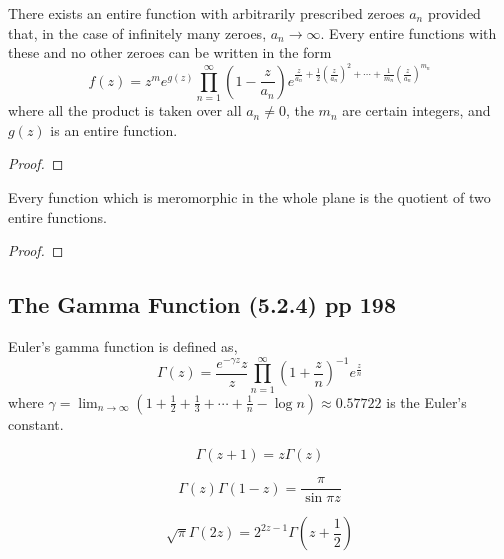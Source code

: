 \begin{theorem}[Weierstrass]
	There exists an entire function with arbitrarily prescribed zeroes $a_n$ provided that, in the case of infinitely many zeroes, $a_n \to \infty$. Every entire functions with these and no other zeroes can be written in the form
	\begin{equation}
		f(z) = z^m e^{g(z)} \prod_{n=1}^\infty \left( 1- \frac{z}{a_n} \right) e^{\frac{z}{a_n} + \frac{1}{2}(\frac{z}{a_n})^2 + \dotsb + \frac{1}{m_n}(\frac{z}{a_n})^{m_n}}
	\end{equation}
	where all the product is taken over all $a_n \ne 0$, the $m_n$ are certain integers, and $g(z)$ is an entire function.
\end{theorem}
\begin{proof}
\end{proof}

\begin{corollary}
	Every function which is meromorphic in the whole plane is the quotient of two entire functions.
\end{corollary}
\begin{proof}
\end{proof}

\subsection{The Gamma Function (5.2.4) pp 198}
\begin{definition}
	Euler's gamma function is defined as,
\begin{equation}
	\Gamma(z) = \frac{e^{-\gamma z}{z}}{z} \prod_{n=1}^\infty \left( 1+\frac{z}{n}\right)^{-1} e^\frac{z}{n}
\end{equation}
	where $\gamma = \displaystyle \lim_{n \to \infty} \left( 1+ \frac{1}{2} + \frac{1}{3} + \dotsb + \frac{1}{n} - \log n \right) \approx 0.57722 $ is the Euler's constant.
\end{definition}
\begin{remark}
	\begin{equation}
		\Gamma(z+1) = z \Gamma(z)
	\end{equation}
\end{remark}
\begin{remark}
	\begin{equation}
		\Gamma(z) \Gamma(1-z) = \frac{\pi}{\sin \pi z}
	\end{equation}
\end{remark}
\begin{remark}
	\begin{equation}
		\sqrt{\pi} \Gamma(2z) = 2^{2z-1} \Gamma\left(z+\frac{1}{2}\right)
	\end{equation}
\end{remark}
